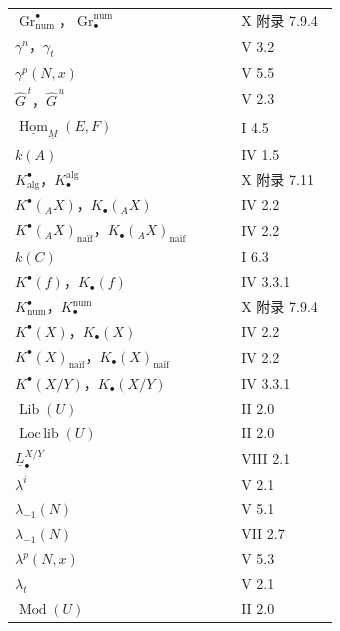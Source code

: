\begin{longtable}{@{}p{0.65\linewidth}p{0.29\linewidth}@{}}
$\operatorname{Gr}^{\bullet}_{\mathrm{num}}$，$\operatorname{Gr}_{\bullet}^{\mathrm{num}}$ & X 附录 7.9.4\\
$\gamma^n$，$\gamma_t$ & V 3.2\\
$\gamma^p(N,x)$ & V 5.5\\
$\widehat G^{\,t}$，$\widehat G^{\,u}$ & V 2.3\\[3pt]
$\underline{\operatorname{Hom}}_{\underline M}(E,F)$ & I 4.5\\[3pt]
$k(A)$ & IV 1.5\\
$K^\bullet_{\mathrm{alg}}$，$K_\bullet^{\mathrm{alg}}$ & X 附录 7.11\\
$K^\bullet({}_AX)$，$K_\bullet({}_AX)$ & IV 2.2\\
$K^\bullet({}_AX)_{\text{naïf}}$，$K_\bullet({}_AX)_{\text{naïf}}$ & IV 2.2\\
$k(C)$ & I 6.3\\
$K^\bullet(f)$，$K_\bullet(f)$ & IV 3.3.1\\
$K^\bullet_{\mathrm{num}}$，$K_\bullet^{\mathrm{num}}$ & X 附录 7.9.4\\
$K^\bullet(X)$，$K_\bullet(X)$ & IV 2.2\\
$K^\bullet(X)_{\text{naïf}}$，$K_\bullet(X)_{\text{naïf}}$ & IV 2.2\\
$K^\bullet(X/Y)$，$K_\bullet(X/Y)$ & IV 3.3.1\\[3pt]
$\operatorname{Lib}(U)$ & II 2.0\\
$\operatorname{Loc\,lib}(U)$ & II 2.0\\
$\underline L^{X/Y}_{\bullet}$ & VIII 2.1\\
$\lambda^i$ & V 2.1\\
$\lambda_{-1}(N)$ & V 5.1\\
$\lambda_{-1}(N)$ & VII 2.7\\
$\lambda^p(N,x)$ & V 5.3\\
$\lambda_t$ & V 2.1\\[3pt]
$\operatorname{Mod}(U)$ & II 2.0
\end{longtable}

